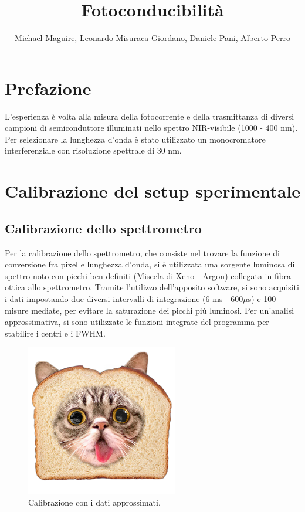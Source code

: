 \documentclass[11pt]{article} %
\title{Fotoconducibilità}
\author{Michael Maguire, Leonardo Misuraca Giordano, Daniele Pani, Alberto Perro}
\begin{document}
\maketitle
\newpage
\section*{Prefazione}
L'esperienza è volta alla misura della fotocorrente e della trasmittanza di diversi campioni di semiconduttore illuminati nello spettro NIR-visibile (1000 - 400 nm). Per selezionare la lunghezza d'onda è stato utilizzato un monocromatore interferenziale con risoluzione spettrale di 30 nm.
\section{Calibrazione del setup sperimentale}
\subsection{Calibrazione dello spettrometro}
Per la calibrazione dello spettrometro, che consiste nel trovare la funzione di conversione fra pixel e lunghezza d'onda, si è utilizzata una sorgente luminosa di spettro noto con picchi ben definiti (Miscela di Xeno - Argon) collegata in fibra ottica allo spettrometro.
Tramite l'utilizzo dell'apposito software, si sono acquisiti i dati impostando due diversi intervalli di integrazione (6 ms - 600$\mu$s) e 100 misure mediate, per evitare la saturazione dei picchi più luminosi. Per un'analisi approssimativa, si sono utilizzate le funzioni integrate del programma per stabilire i centri e i FWHM.
\begin{figure}[h!]
\begin{center}
\includegraphics[height=250px]{img/placeholder.png}
\caption{Calibrazione con i dati approssimati.}
\end{center}
\end{figure}
\end{document}

